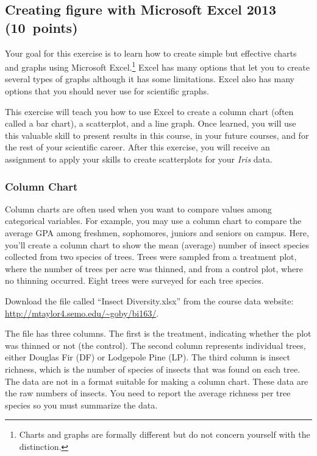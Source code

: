 \documentclass[12pt, hidelinks]{exam}
\newcommand{\hidepoints}{%
	\pointsinmargin\pointformat{}
}
\newcommand{\VSpace}{\vspace{\baselineskip}}
\begin{document}
\hidepoints

\subsection*{Creating figure with Microsoft Excel 2013 (10~points)}

Your goal for this exercise is to learn how to create simple but effective charts and graphs using Microsoft Excel.\footnote{Charts and graphs are formally different but do not concern yourself with the distinction.}  Excel has many options that let you to create several types of graphs although it has some limitations. Excel also has many options that you should never use for scientific graphs. 

This exercise will teach you how to use Excel to create a column chart (often called a bar chart), a scatterplot, and a line graph. Once learned, you will use this valuable skill to present results in this course, in your future courses, and for the rest of your scientific career. After this exercise, you will receive an assignment to apply your skills to create scatterplots for your \textit{Iris} data. 

\subsubsection*{Column Chart}

Column charts are often used when you want to compare values among categorical variables. For example, you may use a column chart to compare the average GPA among freshmen, sophomores, juniors and seniors on campus. Here, you’ll create a column chart to show the mean (average) number of insect species collected from two species of trees. Trees were sampled from a treatment plot, where the number of trees per acre was thinned, and from a control plot, where no thinning occurred. Eight trees were surveyed for each tree species.\VSpace

Download the file called “Insect Diversity.xlsx” from the course data website: \url{http://mtaylor4.semo.edu/~goby/bi163/}.\VSpace

The file has three columns. The first is the treatment, indicating whether the plot was thinned or not (the control). The second column represents individual trees, either Douglas Fir (DF) or Lodgepole Pine (LP). The third column is insect richness, which is the number of species of insects that was found on each tree. The data are not in a format suitable for making a column chart. These data are the raw numbers of insects. You need to report the average richness per tree species so you must summarize the data.
\end{document}
